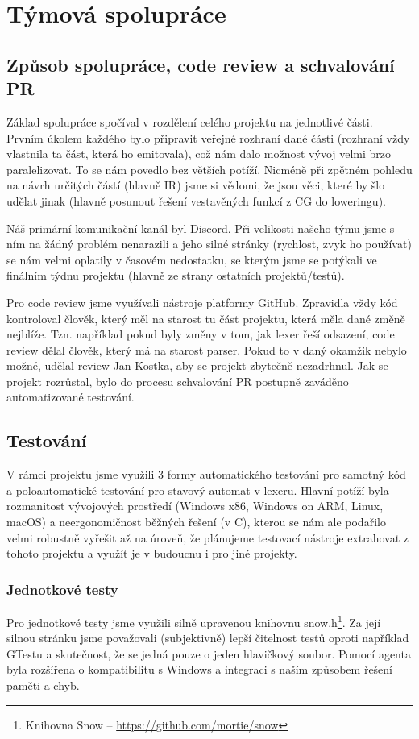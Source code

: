 \documentclass[11pt,a4paper]{article}
\begin{document}
\section{Týmová spolupráce}

\subsection{Způsob spolupráce, code review a schvalování PR}
Základ spolupráce spočíval v rozdělení celého projektu na jednotlivé části. Prvním úkolem každého bylo připravit veřejné rozhraní dané části (rozhraní vždy vlastnila ta část, která ho emitovala), což nám dalo možnost vývoj velmi brzo paralelizovat. To se nám povedlo bez větších potíží. Nicméně při zpětném pohledu na návrh určitých částí (hlavně IR) jsme si vědomi, že jsou věci, které by šlo udělat jinak (hlavně posunout řešení vestavěných funkcí z CG do loweringu).

Náš primární komunikační kanál byl Discord. Při velikosti našeho týmu jsme s ním na žádný problém nenarazili a jeho silné stránky (rychlost, zvyk ho používat) se nám velmi oplatily v časovém nedostatku, se kterým jsme se potýkali ve finálním týdnu projektu (hlavně ze strany ostatních projektů/testů).

Pro code review jsme využívali nástroje platformy GitHub. Zpravidla vždy kód kontroloval člověk, který měl na starost tu část projektu, která měla dané změně nejblíže. Tzn. například pokud byly změny v tom, jak lexer řeší odsazení, code review dělal člověk, který má na starost parser. Pokud to v daný okamžik nebylo možné, udělal review Jan Kostka, aby se projekt zbytečně nezadrhnul. Jak se projekt rozrůstal, bylo do procesu schvalování PR postupně zaváděno automatizované testování.

\subsection{Testování}
V rámci projektu jsme využili 3 formy automatického testování pro samotný kód a poloautomatické testování pro stavový automat v lexeru. Hlavní potíží byla rozmanitost vývojových prostředí (Windows x86, Windows on ARM, Linux, macOS) a neergonomičnost běžných řešení (v C), kterou se nám ale podařilo velmi robustně vyřešit až na úroveň, že plánujeme testovací nástroje extrahovat z tohoto projektu a využít je v budoucnu i pro jiné projekty.

\subsubsection{Jednotkové testy}
Pro jednotkové testy jsme využili silně upravenou knihovnu snow.h\footnote{Knihovna Snow -- \url{https://github.com/mortie/snow}}. Za její silnou stránku jsme považovali (subjektivně) lepší čitelnost testů oproti například GTestu a skutečnost, že se jedná pouze o jeden hlavičkový soubor. Pomocí agenta byla rozšířena o kompatibilitu s Windows a integraci s naším způsobem řešení paměti a chyb.
\end{document}
